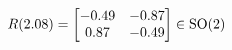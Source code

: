 \documentclass[preview]{standalone}
\begin{document}
\begin{align*}
\special{dvisvgm:raw <g id='unique000'>}R(2.08) = \begin{bmatrix} -0.49 & -0.87 \\ 0.87 & -0.49 \end{bmatrix} \in \text{SO}(2)\special{dvisvgm:raw </g>}
\end{align*}
\end{document}
